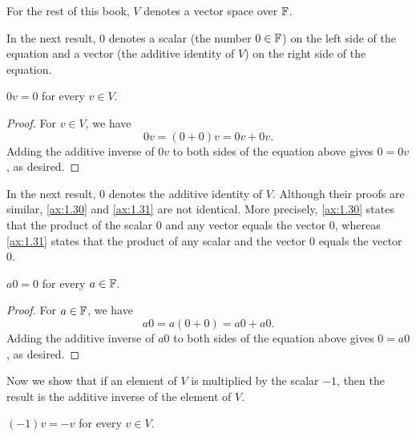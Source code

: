 \begin{notation}[$V$]\label{ax:1.29}
For the rest of this book, $V$ denotes a vector space over $\mathbb{F}$.
\end{notation}

In the next result, $0$ denotes a scalar (the number $0\in\mathbb{F}$) on the left side
of the equation and a vector (the additive identity of $V$) on the right side
of the equation.

\begin{result}\label{ax:1.30}
$0v=0$ for every $v\in V$.
\end{result}

\begin{proof}
For $v\in V$, we have
\[ 0v = (0+0)v = 0v+0v. \]
Adding the additive inverse of $0v$ to both sides of the equation above gives
$0=0v$, as desired.
\end{proof}

%
In the next result, $0$ denotes the additive identity of $V$. Although their
proofs are similar, \ref{ax:1.30} and \ref{ax:1.31} are not identical. More
precisely, \ref{ax:1.30} states that the product of the scalar $0$ and any
vector equals the vector $0$, whereas \ref{ax:1.31} states that the product of
any scalar and the vector $0$ equals the vector $0$.

\begin{result}\label{ax:1.31}
$a0=0$ for every $a\in\mathbb{F}$.
\end{result}

\begin{proof}
For $a\in\mathbb{F}$, we have
\[ a0 = a(0+0) = a0+a0. \]
Adding the additive inverse of $a0$ to both sides of the equation above gives
$0=a0$, as desired.
\end{proof}

Now we show that if an element of $V$ is multiplied by the scalar $-1$, then
the result is the additive inverse of the element of $V$.

\begin{result}\label{ax:1.32}
$(-1)v=-v$ for every $v\in V$.
\end{result}

